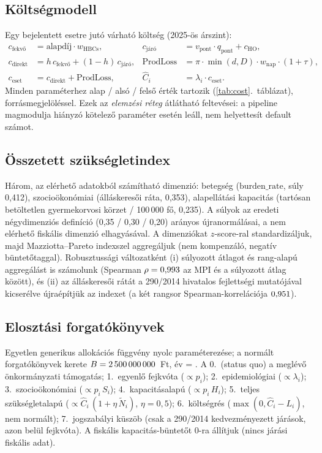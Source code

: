 \documentclass[12pt,a4paper]{article}
\begin{document}
\subsection{Költségmodell}
Egy bejelentett esetre jutó várható költség (2025-ös árszint):
\begin{align}
c_{\text{fekvő}} &= \text{alapdíj}\cdot w_{\text{HBCs}}, &
c_{\text{járó}} &= v_{\text{pont}}\cdot q_{\text{pont}} + c_{\text{HO}},\\
c_{\text{direkt}} &= h\, c_{\text{fekvő}} + (1-h)\, c_{\text{járó}}, &
\text{ProdLoss} &= \pi\cdot \min(d, D)\cdot w_{\text{nap}}\cdot(1+\tau),\\
c_{\text{eset}} &= c_{\text{direkt}} + \text{ProdLoss}, &
\widehat C_i &= \lambda_i\cdot c_{\text{eset}}.
\end{align}
Minden paraméterhez alap / alsó / felső érték tartozik
(\ref{tab:cost}.~táblázat), forrásmegjelöléssel. Ezek az \emph{elemzési
réteg} átlátható feltevései: a pipeline magmodulja hiányzó kötelező paraméter
esetén leáll, nem helyettesít default számot.



\subsection{Összetett szükségletindex}
Három, az elérhető adatokból számítható dimenzió: betegség
($\mathrm{burden\_rate}$, súly 0{,}412), szocioökonómiai (álláskeresői ráta,
0{,}353), alapellátási kapacitás (tartósan betöltetlen gyermekorvosi körzet /
100\,000 fő, 0{,}235). A súlyok az eredeti négydimenziós definíció (0{,}35 /
0{,}30 / 0{,}20) arányos újranormálásai, a nem elérhető fiskális dimenzió
elhagyásával. A dimenziókat $z$-score-ral standardizáljuk, majd
Mazziotta--Pareto indexszel aggregáljuk (nem kompenzáló, negatív
büntetőtaggal). Robusztussági változatként (i) súlyozott átlagot és
rang-alapú aggregálást is számolunk (Spearman
$\rho=0{,}993$ az MPI és a súlyozott átlag között), és
(ii) az álláskeresői rátát a 290/2014 hivatalos fejlettségi mutatójával
kicserélve újraépítjük az indexet (a két rangsor Spearman-korrelációja
$0{,}951$).

\subsection{Elosztási forgatókönyvek}
Egyetlen generikus allokációs függvény nyolc paraméterezése; a normált
forgatókönyvek kerete $B = 2\,500\,000\,000$~Ft, év = \csYear. A 0.~(status quo) a
meglévő önkormányzati támogatás; 1.~egyenlő fejkvóta ($\propto p_i$);
2.~epidemiológiai ($\propto \lambda_i$); 3.~szocioökonómiai
($\propto p_i\, S_i$); 4.~kapacitásalapú ($\propto p_i\, H_i$); 5.~teljes
szükségletalapú ($\propto \widehat C_i\,(1+\eta\,\tilde N_i)$, $\eta=0{,}5$);
6.~költségrés ($\max(0,\widehat C_i - L_i)$, nem normált); 7.~jogszabályi
küszöb (csak a 290/2014 kedvezményezett járások, azon belül fejkvóta). A
fiskális kapacitás-büntetőt 0-ra állítjuk (nincs járási fiskális adat).
\end{document}
